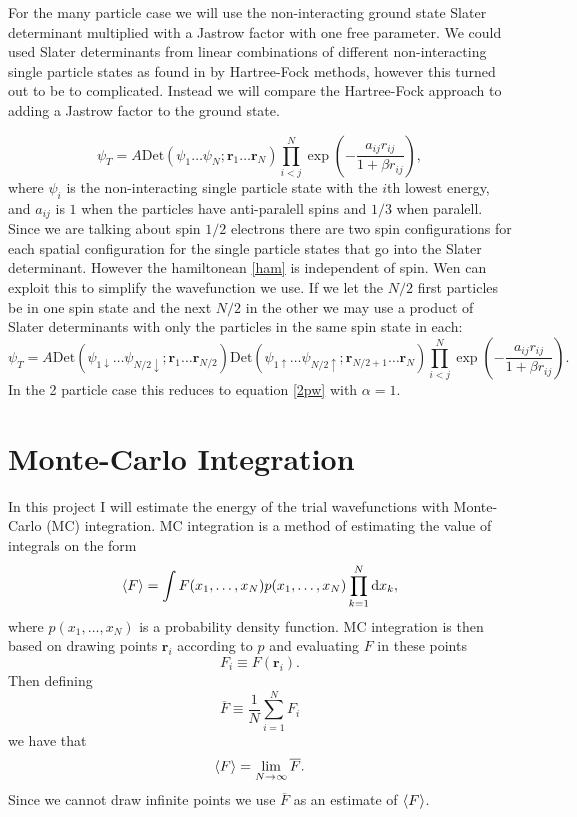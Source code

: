 \documentclass[a4paper,norsk,10pt]{article}
\newcommand{\bb}[1]{\boldsymbol{#1}}
\newcommand{\dd}{\mathrm{d}}
\newcommand{\rar}{\rightarrow}
\newcommand{\uar}{\uparrow}
\newcommand{\dar}{\downarrow}
\newcommand{\be}{\begin{equation}}
\newcommand{\ee}{\end{equation}}
\newcommand{\f}{\frac}
\renewcommand{\bar}{\overline}
\renewcommand{\braket}{\Braket}
\begin{document}
For the many particle case we will use the non-interacting ground state Slater determinant multiplied with a Jastrow factor with one free parameter.
We could used Slater determinants from linear combinations of different non-interacting single particle states as found in \cite{proj1} by Hartree-Fock methods,
however this turned out to be to complicated. Instead we will compare the Hartree-Fock approach to adding a Jastrow factor to the ground state.

\be
\psi_T = A \mathrm{Det}\left(\psi_1\ldots\psi_N;\bb{r}_1\ldots\bb{r}_N\right)\prod_{i<j}^N\exp\left(-\f{a_{ij}r_{ij}}{1+\beta r_{ij}}\right),
\ee
where  $\psi_i$ is the non-interacting single particle state with the $i$th lowest energy,
and $a_{ij}$ is $1$ when the particles have anti-paralell spins and $1/3$ when paralell.
Since we are talking about spin $1/2$ electrons there are two spin configurations for each spatial configuration for the single particle states that go into the Slater determinant.
However the hamiltonean \ref{ham} is independent of spin. Wen can exploit this to simplify the wavefunction we use. If we let
the $N/2$ first particles be in one spin state and the next $N/2$ in the other we may use a product of Slater determinants with only the particles in the same spin state in each:
\be
\psi_T = A\mathrm{Det}\left(\psi_{1\dar}\ldots\psi_{N/2\dar};\bb{r}_1\ldots\bb{r}_{N/2}\right)\mathrm{Det}\left(\psi_{1\uar}\ldots\psi_{N/2\uar};\bb{r}_{N/2+1}\ldots\bb{r}_N\right)\prod_{i<j}^N\exp\left(-\f{a_{ij}r_{ij}}{1+\beta r_{ij}}\right).\label{npw}
\ee
In the 2 particle case this reduces to equation \ref{2pw} with $\alpha = 1$.


\section{Monte-Carlo Integration}

In this project I will estimate the energy of the trial wavefunctions with Monte-Carlo (MC) integration.
MC integration is a method of estimating the value of integrals on the form
\be
\braket{F} = \int F(x_1,\ldots,x_N)p(x_1,\ldots,x_N)\prod_{k=1}^N\dd x_k, \label{MCI}
\ee
where \(p(x_1,\ldots,x_N)\) is a probability density function.
MC integration is then based on drawing points $\bb{r}_i$ according to $p$ and evaluating $F$ in these points
\be
F_i \equiv F(\bb{r}_i).
\ee
Then defining
\be
\bar{F} \equiv \f{1}{N}\sum_{i=1}^N F_i
\ee
we have that
\be
\braket{F} = \lim_{N\rar\infty}\bar{F}.
\ee
Since we cannot draw infinite points we use $\bar{F}$ as an estimate of $\braket{F}$.
\end{document}

